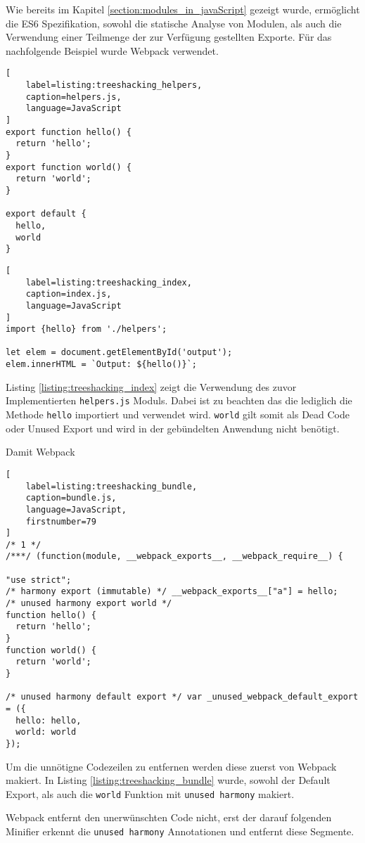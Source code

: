 Wie bereits im Kapitel \ref{section:modules_in_javaScript} gezeigt wurde, ermöglicht die ES6 Spezifikation, sowohl die statische Analyse von Modulen, als auch die Verwendung einer Teilmenge der zur Verfügung gestellten Exporte.
Für das nachfolgende Beispiel wurde Webpack verwendet.

\begin{lstlisting}[
    label=listing:treeshacking_helpers,
	caption=helpers.js,
	language=JavaScript
]
export function hello() {
  return 'hello';
}
export function world() {
  return 'world';
}

export default {
  hello,
  world
}
\end{lstlisting}

\begin{lstlisting}[
    label=listing:treeshacking_index,
	caption=index.js,
	language=JavaScript
]
import {hello} from './helpers';

let elem = document.getElementById('output');
elem.innerHTML = `Output: ${hello()}`;
\end{lstlisting}

Listing \ref{listing:treeshacking_index} zeigt die Verwendung des zuvor Implementierten \lstinline{helpers.js} Moduls. Dabei ist zu beachten das die lediglich die Methode \lstinline{hello} importiert und verwendet wird. \lstinline{world} gilt somit als Dead Code oder Unused Export und wird in der gebündelten Anwendung nicht benötigt.

Damit Webpack

\begin{lstlisting}[
    label=listing:treeshacking_bundle,
	caption=bundle.js,
	language=JavaScript,
    firstnumber=79
]
/* 1 */
/***/ (function(module, __webpack_exports__, __webpack_require__) {

"use strict";
/* harmony export (immutable) */ __webpack_exports__["a"] = hello;
/* unused harmony export world */
function hello() {
  return 'hello';
}
function world() {
  return 'world';
}

/* unused harmony default export */ var _unused_webpack_default_export = ({
  hello: hello,
  world: world
});
\end{lstlisting}

Um die unnötigne Codezeilen zu entfernen werden diese zuerst von Webpack makiert. In Listing \ref{listing:treeshacking_bundle} wurde, sowohl der Default Export, als auch die \lstinline{world} Funktion mit \lstinline{unused harmony} makiert.

Webpack entfernt den unerwünschten Code nicht, erst der darauf folgenden Minifier erkennt die \lstinline{unused harmony} Annotationen und entfernt diese Segmente.

